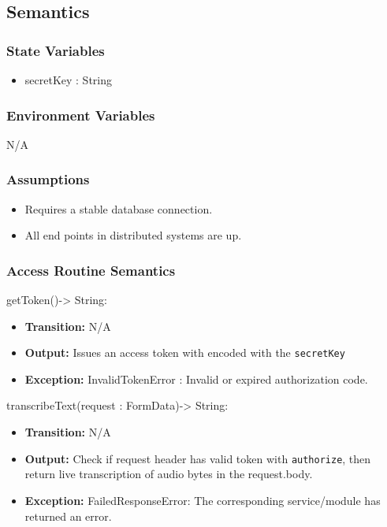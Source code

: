 \documentclass[12pt, titlepage]{article}
\begin{document}
\subsection{Semantics}

\subsubsection{State Variables}

\begin{itemize}
  \item secretKey : String 
\end{itemize}

\subsubsection{Environment Variables}

N/A

\subsubsection{Assumptions}

\begin{itemize}
  \item Requires a stable database connection.
  \item All end points in distributed systems are up.
\end{itemize}

\subsubsection{Access Routine Semantics}

\noindent getToken()-> String:
\begin{itemize}
    \item \textbf{Transition:} N/A
    \item \textbf{Output:} Issues an access token with encoded with the \texttt{secretKey}
    \item \textbf{Exception:} InvalidTokenError : Invalid or expired authorization code.
\end{itemize}

\noindent transcribeText(request : FormData)-> String:
\begin{itemize}
    \item \textbf{Transition:} N/A
    \item \textbf{Output:} Check if request header has valid token with \texttt{authorize}, then return live transcription of audio bytes in the request.body.
    \item \textbf{Exception:} FailedResponseError: The corresponding service/module has returned an error.
\end{itemize}
\end{document}
